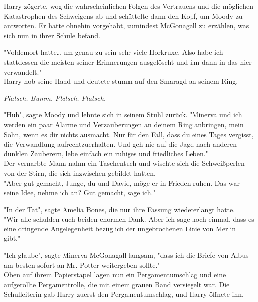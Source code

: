 {Harry zögerte, wog die wahrscheinlichen Folgen des Vertrauens und die möglichen Katastrophen des Schweigens ab und schüttelte dann den Kopf, um Moody zu antworten. Er hatte ohnehin vorgehabt, zumindest McGonagall zu erzählen, was sich nun in ihrer Schule befand.

"Voldemort hatte… um genau zu sein sehr viele Horkruxe. Also habe ich stattdessen die meisten seiner Erinnerungen ausgelöscht und ihn dann in das hier verwandelt."\\ Harry hob seine Hand und deutete stumm auf den Smaragd an seinem Ring.

\emph{Platsch. Bumm. Platsch. Platsch.}

"Huh", sagte Moody und lehnte sich in seinem Stuhl zurück. "Minerva und ich werden ein paar Alarme und Verzauberungen an deinem Ring anbringen, mein Sohn, wenn es dir nichts ausmacht. Nur für den Fall, dass du eines Tages vergisst, die Verwandlung aufrechtzuerhalten. Und geh nie auf die Jagd nach anderen dunklen Zauberern, lebe einfach ein ruhiges und friedliches Leben."\\ Der vernarbte Mann nahm ein Taschentuch und wischte sich die Schweißperlen von der Stirn, die sich inzwischen gebildet hatten.\\ "Aber gut gemacht, Junge, du und David, möge er in Frieden ruhen. Das war seine Idee, nehme ich an? Gut gemacht, sage ich."

"In der Tat", sagte Amelia Bones, die nun ihre Fassung wiedererlangt hatte.\\ "Wir alle schulden euch beiden enormen Dank. Aber ich sage noch einmal, dass es eine dringende Angelegenheit bezüglich der ungebrochenen Linie von Merlin gibt."

"Ich glaube", sagte Minerva McGonagall langsam, "dass ich die Briefe von Albus am besten sofort an Mr. Potter weitergeben sollte."\\ Oben auf ihrem Papierstapel lagen nun ein Pergamentumschlag und eine aufgerollte Pergamentrolle, die mit einem grauen Band versiegelt war. Die Schulleiterin gab Harry zuerst den Pergamentumschlag, und Harry öffnete ihn.

}
